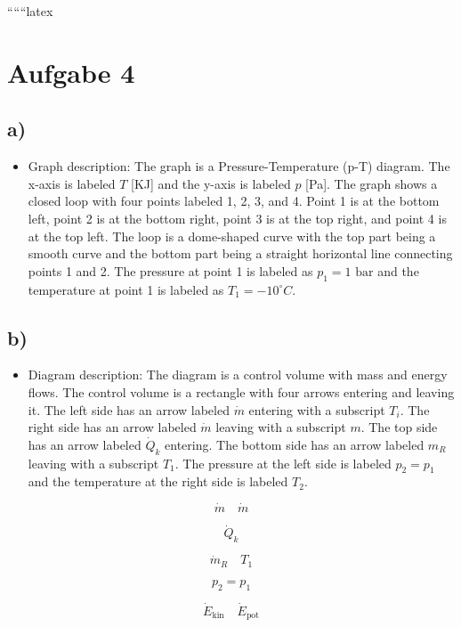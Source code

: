 
``````latex


\section*{Aufgabe 4}

\subsection*{a)}

\begin{itemize}
    \item Graph description: The graph is a Pressure-Temperature (p-T) diagram. The x-axis is labeled $T$ [KJ] and the y-axis is labeled $p$ [Pa]. The graph shows a closed loop with four points labeled 1, 2, 3, and 4. Point 1 is at the bottom left, point 2 is at the bottom right, point 3 is at the top right, and point 4 is at the top left. The loop is a dome-shaped curve with the top part being a smooth curve and the bottom part being a straight horizontal line connecting points 1 and 2. The pressure at point 1 is labeled as $p_1 = 1 \text{ bar}$ and the temperature at point 1 is labeled as $T_1 = -10^\circ C$.
\end{itemize}

\subsection*{b)}

\begin{itemize}
    \item Diagram description: The diagram is a control volume with mass and energy flows. The control volume is a rectangle with four arrows entering and leaving it. The left side has an arrow labeled $\dot{m}$ entering with a subscript $T_i$. The right side has an arrow labeled $\dot{m}$ leaving with a subscript $m$. The top side has an arrow labeled $\dot{Q}_k$ entering. The bottom side has an arrow labeled $m_R$ leaving with a subscript $T_1$. The pressure at the left side is labeled $p_2 = p_1$ and the temperature at the right side is labeled $T_2$.
\end{itemize}

\[
\dot{m} \quad \dot{m}
\]

\[
\dot{Q}_k
\]

\[
\dot{m}_R \quad T_1
\]

\[
p_2 = p_1
\]

\[
\dot{E}_{\text{kin}} \quad \dot{E}_{\text{pot}}
\]

